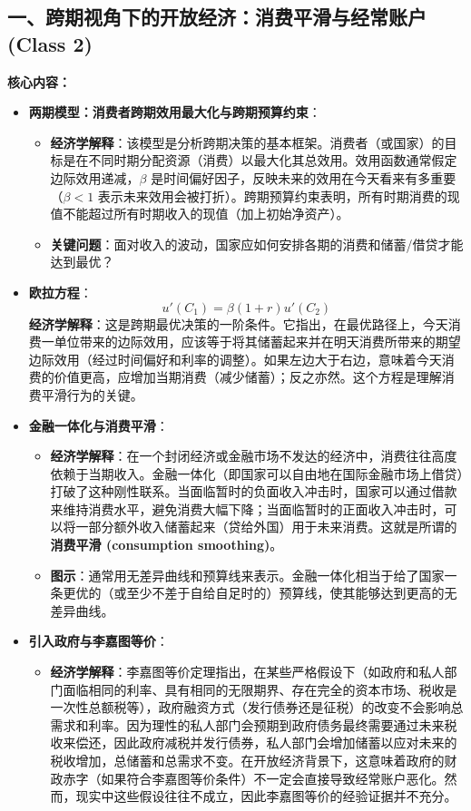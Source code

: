 \documentclass[12pt]{article}
\begin{document}
\subsection*{一、跨期视角下的开放经济：消费平滑与经常账户 (Class 2)}

\textbf{核心内容：}
\begin{itemize}
    \item \textbf{两期模型：消费者跨期效用最大化与跨期预算约束}：
    \begin{itemize}
        \item \textbf{经济学解释}：该模型是分析跨期决策的基本框架。消费者（或国家）的目标是在不同时期分配资源（消费）以最大化其总效用。效用函数通常假定边际效用递减，$\beta$ 是时间偏好因子，反映未来的效用在今天看来有多重要（$\beta < 1$ 表示未来效用会被打折）。跨期预算约束表明，所有时期消费的现值不能超过所有时期收入的现值（加上初始净资产）。
        \item \textbf{关键问题}：面对收入的波动，国家应如何安排各期的消费和储蓄/借贷才能达到最优？
    \end{itemize}
    \item \textbf{欧拉方程}：
    \[
    u'(C_1) = \beta(1+r)u'(C_2)
    \]
    \textbf{经济学解释}：这是跨期最优决策的一阶条件。它指出，在最优路径上，今天消费一单位带来的边际效用，应该等于将其储蓄起来并在明天消费所带来的期望边际效用（经过时间偏好和利率的调整）。如果左边大于右边，意味着今天消费的价值更高，应增加当期消费（减少储蓄）；反之亦然。这个方程是理解消费平滑行为的关键。
    \item \textbf{金融一体化与消费平滑}：
    \begin{itemize}
        \item \textbf{经济学解释}：在一个封闭经济或金融市场不发达的经济中，消费往往高度依赖于当期收入。金融一体化（即国家可以自由地在国际金融市场上借贷）打破了这种刚性联系。当面临暂时的负面收入冲击时，国家可以通过借款来维持消费水平，避免消费大幅下降；当面临暂时的正面收入冲击时，可以将一部分额外收入储蓄起来（贷给外国）用于未来消费。这就是所谓的\textbf{消费平滑 (consumption smoothing)}。
        \item \textbf{图示}：通常用无差异曲线和预算线来表示。金融一体化相当于给了国家一条更优的（或至少不差于自给自足时的）预算线，使其能够达到更高的无差异曲线。
    \end{itemize}
    \item \textbf{引入政府与李嘉图等价}：
    \begin{itemize}
        \item \textbf{经济学解释}：李嘉图等价定理指出，在某些严格假设下（如政府和私人部门面临相同的利率、具有相同的无限期界、存在完全的资本市场、税收是一次性总额税等），政府融资方式（发行债券还是征税）的改变不会影响总需求和利率。因为理性的私人部门会预期到政府债务最终需要通过未来税收来偿还，因此政府减税并发行债券，私人部门会增加储蓄以应对未来的税收增加，总储蓄和总需求不变。在开放经济背景下，这意味着政府的财政赤字（如果符合李嘉图等价条件）不一定会直接导致经常账户恶化。然而，现实中这些假设往往不成立，因此李嘉图等价的经验证据并不充分。

\end{itemize}
\end{itemize}
\end{document}
